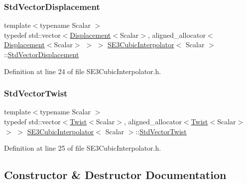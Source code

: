 \subsubsection{\texorpdfstring{Std\+Vector\+Displacement}{StdVectorDisplacement}}
{\footnotesize\ttfamily template$<$typename Scalar $>$ \\
typedef std\+::vector$<$\hyperlink{class_displacement}{Displacement}$<$Scalar$>$, aligned\+\_\+allocator$<$\hyperlink{class_displacement}{Displacement}$<$Scalar$>$ $>$ $>$ \hyperlink{class_s_e3_cubic_interpolator}{S\+E3\+Cubic\+Interpolator}$<$ Scalar $>$\+::\hyperlink{class_s_e3_cubic_interpolator_ad6c935ddaa217d370411c200321dc089}{Std\+Vector\+Displacement}}



Definition at line 24 of file S\+E3\+Cubic\+Interpolator.\+h.

\hypertarget{class_s_e3_cubic_interpolator_ae70acde9b57ec38aaf1eaeee50bb35c5}{}\label{class_s_e3_cubic_interpolator_ae70acde9b57ec38aaf1eaeee50bb35c5} 
\subsubsection{\texorpdfstring{Std\+Vector\+Twist}{StdVectorTwist}}
{\footnotesize\ttfamily template$<$typename Scalar $>$ \\
typedef std\+::vector$<$\hyperlink{class_twist}{Twist}$<$Scalar$>$, aligned\+\_\+allocator$<$\hyperlink{class_twist}{Twist}$<$Scalar$>$ $>$ $>$ \hyperlink{class_s_e3_cubic_interpolator}{S\+E3\+Cubic\+Interpolator}$<$ Scalar $>$\+::\hyperlink{class_s_e3_cubic_interpolator_ae70acde9b57ec38aaf1eaeee50bb35c5}{Std\+Vector\+Twist}}



Definition at line 25 of file S\+E3\+Cubic\+Interpolator.\+h.



\subsection{Constructor \& Destructor Documentation}
\hypertarget{class_s_e3_cubic_interpolator_a17856cd852a2260ea88169617997b02e}{}\label{class_s_e3_cubic_interpolator_a17856cd852a2260ea88169617997b02e} 
